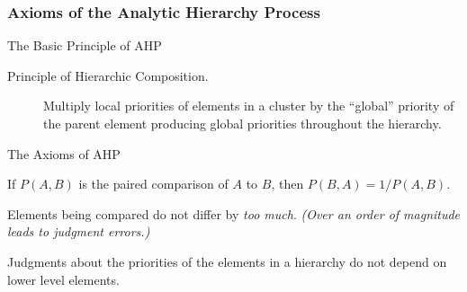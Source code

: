 \documentclass[10pt,handout,hyperref={colorlinks=true,linkcolor=blue,citecolor=citelink,urlcolor=gray}]{beamer}
\newcounter{e_temp}
\begin{document}
\begin{frame}[label=axioms]
\frametitle{Axioms of the Analytic Hierarchy Process}
\begin{block}{The Basic Principle of AHP{\normalfont\footnotemark}}
\begin{description}
\item[Principle of Hierarchic Composition.] Multiply local priorities of elements in a cluster by the ``global'' priority of the parent element producing global priorities throughout the hierarchy.
\end{description}
\end{block}
\pause
\vfill
\begin{block}{The Axioms of AHP}
\begin{description}
\setlength{\itemsep}{2ex}
\item[Reciprocal Axiom]  If $P(A,B)$ is the paired comparison of $A$ to $B$, then $P(B,A)=1/P(A,B)$.
\pause
\item[Homogeneity Axiom]\hspace{-3pt}  Elements being compared do not differ by \emph{too much}.\newline\mbox{} \hfill {\it\footnotesize(Over an order of magnitude leads to judgment errors.)}
\pause
\item[Synthesis Axiom] Judgments about the priorities of the elements in a hierarchy do not depend on lower level elements.
\end{description}
\end{block}
\vfill
{}
\end{frame}
\end{document}
